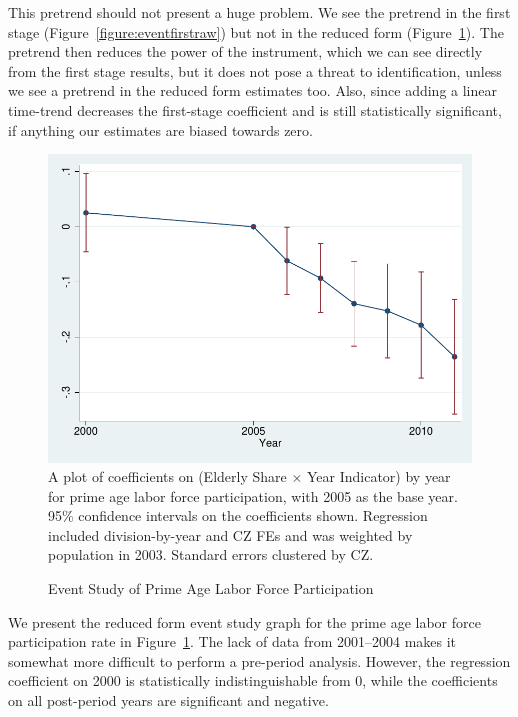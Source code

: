 \documentclass[12pt]{article}
\begin{document}
This pretrend should not present a huge problem.  We see the pretrend in the first stage (Figure~\ref{figure:eventfirstraw}) but not in the reduced form (Figure~\ref{figure:eventreduced}). The pretrend then reduces the power of the instrument, which we can see directly from the first stage results, but it does not pose a threat to identification, unless we see a pretrend in the reduced form estimates too.  Also, since adding a linear time-trend decreases the first-stage coefficient and is still statistically significant, if anything our estimates are biased towards zero.

\begin{figure}[htbp]
    \centering
    \caption{Event Study of Prime Age Labor Force Participation}
    \begin{minipage}{0.75\textwidth}
    \includegraphics[width=\textwidth]{figs/event_rf.pdf}
    \footnotesize
    A plot of coefficients on (Elderly Share $\times$ Year Indicator) by year for prime age labor force participation, with 2005 as the base year.  95\% confidence intervals on the coefficients shown.  Regression included division-by-year and CZ FEs and was weighted by population in 2003.  Standard errors clustered by CZ\@.
    \end{minipage}
    \label{figure:eventreduced}
\end{figure}

We present the reduced form event study graph for the prime age labor force participation rate in Figure~\ref{figure:eventreduced}.  The lack of data from 2001--2004 makes it somewhat more difficult to perform a pre-period analysis.  However, the regression coefficient on 2000 is statistically indistinguishable from 0, while the coefficients on all post-period years are significant and negative.
\end{document}
